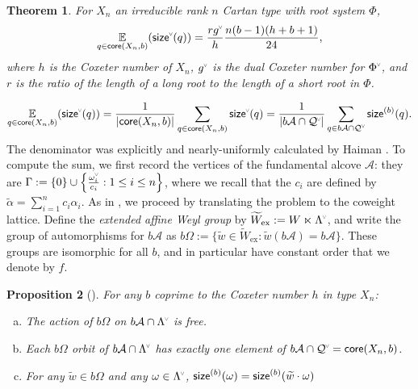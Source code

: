 \documentclass[10pt,a4paper]{amsart}
\newcommand{\defn}[1]{\emph{#1}}
\newcommand{\chk}[1]{#1^{\normalfont\smash{\scalebox{.5}[.5]{\rotatebox{90}{\textbf{\textless}}}}}}
\newcommand{\Expt}[2]{\operatorname*{\mathbb{E}}\limits_{#1}(#2)}
\newcommand{\wa}{\widetilde{W}}
\newcommand{\Q}{\mathcal{Q}}
\newcommand{\ac}{\mathcal{A}}
\newcommand{\cw}{\chk{\omega}}
\newcommand{\core}{{\sf core}}
\newcommand{\cwl}{\chk{\Lambda}}
\newcommand{\wex}{\wa_{\mathrm{ex}}}
\newcommand{\cycl}{\Omega}
\newcommand{\waf}{\widetilde{w}}
\newcommand{\wf}{\waf_{\rat}}
\newcommand{\size}{{\sf size}}
\newcommand{\sizeb}{\size^{(b)}}
\newcommand{\rat}{b}
\newtheorem{theorem}{Theorem}[section]
\newtheorem{prop}[theorem]{Proposition}
\theoremstyle{definition}
\theoremstyle{remark}
\begin{document}
\setcounter{theorem}{0}\begin{theorem}\label{thm:main_thm}
For $X_n$ an irreducible rank $n$ Cartan type with root system $\Phi$,
\begin{equation*}
\Expt{q \in \core(X_n,b)}{\chk{\size}(q)}=\frac{r \chk{g}}{h}\frac{n(b-1)(h+b+1)}{24},
\end{equation*}
where $h$ is the Coxeter number of $X_n$, $\chk{g}$ is the dual Coxeter number for $\chk{\Phi}$, and $r$ is the ratio of the length of a long root to the length of a short root in $\Phi$.

\end{theorem}
\begin{equation*}
    \Expt{q \in \core(X_n,b)}{\chk{\size}(q)} 
    = \frac{1}{|\core(X_n,b)|}\sum_{q\in \core(X_n,b)} \chk{\size}(q) = \frac{1}{|b\ac\cap\chk{\Q}|}\sum_{q\in b\ac\cap\chk{\Q}} \sizeb(q).
\end{equation*} 
The denominator was explicitly and nearly-uniformly calculated by Haiman \cite{haiman1994conjectures}. To compute the sum, we first record the vertices of the fundamental alcove $\ac$: they are \(\Gamma:=\{0\}\cup\left\{\frac{\cw_i}{c_i} : 1 \leq i \leq n\right\}\), where we recall that the $c_i$ are defined by $\widetilde{\alpha}=\sum_{i=1}^nc_i\alpha_i$.  As in \cite{thiel2017strange}, we proceed by translating the problem to the coweight lattice.  Define the \defn{extended affine Weyl group} by $\wex:=W\ltimes \cwl$, and write the group of automorphisms for $b\ac$ as $b\cycl:=\{\waf\in\wex:\waf(b\ac)=b\ac\}$. These groups are isomorphic for all $b$, and in particular have constant order that we denote by $f$.

\begin{prop}[{\cite[Theorem 2.5 \& Lemma 6.11]{thiel2017strange}}]
For any $b$ coprime to the Coxeter number $h$ in type $X_n$:
	\begin{enumerate}[(a)]
	\item The action of $b\cycl$ on $b\ac\cap\cwl$ is free.
	\item Each $b\cycl$ orbit of $b\ac\cap\cwl$ has exactly one element of $b\ac\cap\chk{\Q}=\core(X_n,b)$.
	\item For any $\waf\in b\cycl$ and any $\omega\in\cwl$, $\size^{(b)}(\omega)=\size^{(b)}(\waf\cdot\omega)$
	\end{enumerate}
\label{prop:barational}
\end{prop}
\end{document}
